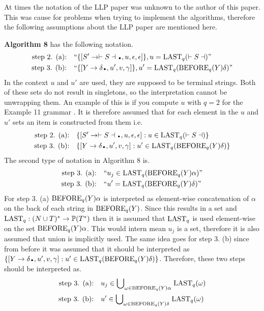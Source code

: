 At times the notation of the LLP paper \cite{Vagner2007} was unknown to the author of this paper. This was cause for problems when trying to implement the algorithms, therefore the following assumptions about the LLP paper \cite{Vagner2007} are mentioned here.

\textbf{Algorithm 8} \cite[13]{Vagner2007} has the following notation.
\begin{align*}
    \text{step 2. (a):}& \quad \text{``}\{[S' \to \vdash S \dashv \bigdot , u, \epsilon, \epsilon]\}, u = \LAST_q(\vdash S \dashv)\text{''} \\
    \text{step 3. (b):}& \quad \text{``}\{[Y \to \delta \bigdot , u', v, \gamma]\}, u' = \LAST_q(\BEFORE_q(Y)\delta)\text{''}
\end{align*}    
In the context $u$ and $u'$ are used, they are supposed to be terminal strings. Both of these sets do not result in singletons, so the interpretation cannot be unwrapping them. An example of this is if you compute $u$ with $q=2$ for the Example 11 grammar \cite[14]{Vagner2007}. It is therefore assumed that for each element in the $u$ and $u'$ sets an item is constructed from them i.e.
\begin{align*}
    \text{step 2. (a):}& \quad \{[S' \to \vdash S \dashv \bigdot, u, \epsilon, \epsilon] : u \in \LAST_q(\vdash S \dashv)\} \\
    \text{step 3. (b):}& \quad \{[Y \to \delta \bigdot , u', v, \gamma] : u' \in \LAST_q(\BEFORE_q(Y)\delta)\}
\end{align*}
The second type of notation in Algorithm 8 is.
\begin{align*}
    \text{step 3. (a):}& \quad \text{``} u_j \in \text{LAST}_q(\text{BEFORE}_q(Y) \alpha)\text{''} \\
    \text{step 3. (b):}& \quad \text{``} u' = \text{LAST}_q(\text{BEFORE}_q(Y)\delta)\text{''}
\end{align*}    
For step 3. (a) $\text{BEFORE}_q(Y) \alpha$ is interpreted as element-wise concatenation of $\alpha$ on the back of each string in $\text{BEFORE}_q(Y)$. Since this results in a set and $\text{LAST}_q: (N \cup T)^* \to \mathbb{P}(T^*)$ then it is assumed that $\text{LAST}_q$ is used element-wise on the set $\text{BEFORE}_q(Y) \alpha$. This would intern mean $u_j$ is a set, therefore it is also assumed that union is implicitly used. The same idea goes for step 3. (b) since from before it was assumed that it should be interpreted as $\{[Y \to \delta \bigdot , u', v, \gamma] : u' \in \LAST_q(\BEFORE_q(Y)\delta)\}$. Therefore, these two steps should be interpreted as.
\begin{align*}
    \text{step 3. (a):}& \quad u_j \in \text{$\bigcup$}_{\omega \in \text{BEFORE}_q(Y) \alpha} \; \text{LAST}_q(\omega) \\
    \text{step 3. (b):}& \quad  u' \in \text{$\bigcup$}_{\omega \in \text{BEFORE}_q(Y) \delta} \; \text{LAST}_q(\omega)
\end{align*}
